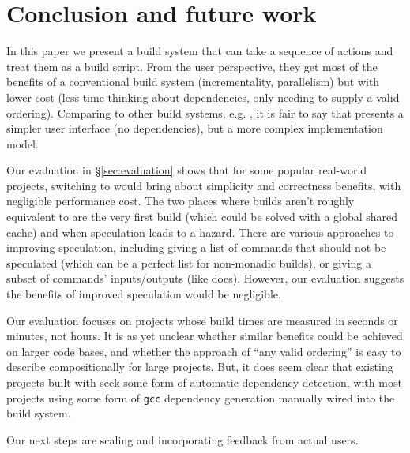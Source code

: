 \section{Conclusion and future work}
\label{sec:conclusion}

In this paper we present a build system that can take a sequence of actions and treat them as a build script. From the user perspective, they get most of the benefits of a conventional build system (incrementality, parallelism) but with lower cost (less time thinking about dependencies, only needing to supply a valid ordering). Comparing \Rattle to other build systems, e.g. \Make, it is fair to say that \Rattle presents a simpler user interface (no dependencies), but a more complex implementation model.

Our evaluation in \S\ref{sec:evaluation} shows that for some popular real-world projects, switching to \Rattle would bring about simplicity and correctness benefits, with negligible performance cost. The two places where builds aren't roughly equivalent to \Make are the very first build (which could be solved with a global shared cache) and when speculation leads to a hazard. There are various approaches to improving speculation, including giving \Rattle a list of commands that should not be speculated (which can be a perfect list for non-monadic builds), or giving \Rattle a subset of commands' inputs/outputs (like \Fac does). However, our evaluation suggests the benefits of improved speculation would be negligible.

Our evaluation focuses on projects whose build times are measured in seconds or minutes, not hours. It is as yet unclear whether similar benefits could be achieved on larger code bases, and whether the \Rattle approach of ``any valid ordering'' is easy to describe compositionally for large projects.  But, it does seem clear that existing projects built with \Make seek some form of automatic dependency detection, with most projects using some form of \texttt{gcc} dependency generation manually wired into the build system.

Our next steps are scaling \Rattle and incorporating feedback from actual users.


